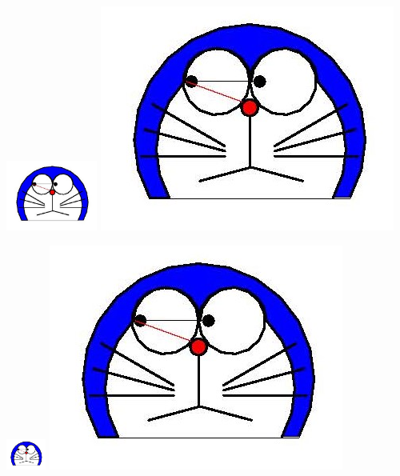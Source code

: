 \documentclass{article}
\begin{document}
\includegraphics[width=3cm]{doraemon1.jpg}
\includegraphics[width=.3\textwidth]{doraemon1.jpg}

\includegraphics[height=1cm]{doraemon1.jpg}
\includegraphics[height=.1\textheight]{doraemon1.jpg}
\end{document}
